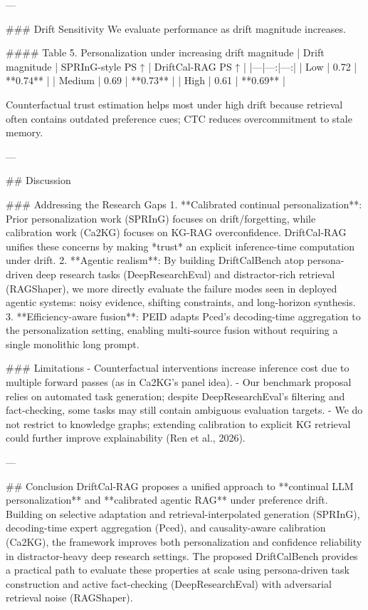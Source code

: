 ---

### Drift Sensitivity  
We evaluate performance as drift magnitude increases.

#### Table 5. Personalization under increasing drift magnitude  
| Drift magnitude | SPRInG-style PS ↑ | DriftCal-RAG PS ↑ |
|---|---:|---:|
| Low | 0.72 | **0.74** |
| Medium | 0.69 | **0.73** |
| High | 0.61 | **0.69** |

Counterfactual trust estimation helps most under high drift because retrieval often contains outdated preference cues; CTC reduces overcommitment to stale memory.

---

## Discussion  

### Addressing the Research Gaps  
1. **Calibrated continual personalization**: Prior personalization work (SPRInG) focuses on drift/forgetting, while calibration work (Ca2KG) focuses on KG-RAG overconfidence. DriftCal-RAG unifies these concerns by making *trust* an explicit inference-time computation under drift.  
2. **Agentic realism**: By building DriftCalBench atop persona-driven deep research tasks (DeepResearchEval) and distractor-rich retrieval (RAGShaper), we more directly evaluate the failure modes seen in deployed agentic systems: noisy evidence, shifting constraints, and long-horizon synthesis.  
3. **Efficiency-aware fusion**: PEID adapts Pced’s decoding-time aggregation to the personalization setting, enabling multi-source fusion without requiring a single monolithic long prompt.

### Limitations  
- Counterfactual interventions increase inference cost due to multiple forward passes (as in Ca2KG’s panel idea).  
- Our benchmark proposal relies on automated task generation; despite DeepResearchEval’s filtering and fact-checking, some tasks may still contain ambiguous evaluation targets.  
- We do not restrict to knowledge graphs; extending calibration to explicit KG retrieval could further improve explainability (Ren et al., 2026).

---

## Conclusion  
DriftCal-RAG proposes a unified approach to **continual LLM personalization** and **calibrated agentic RAG** under preference drift. Building on selective adaptation and retrieval-interpolated generation (SPRInG), decoding-time expert aggregation (Pced), and causality-aware calibration (Ca2KG), the framework improves both personalization and confidence reliability in distractor-heavy deep research settings. The proposed DriftCalBench provides a practical path to evaluate these properties at scale using persona-driven task construction and active fact-checking (DeepResearchEval) with adversarial retrieval noise (RAGShaper).

